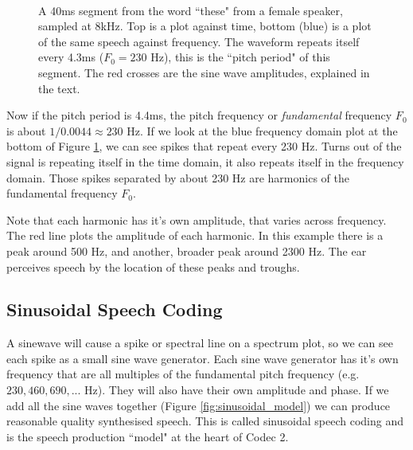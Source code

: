 \documentclass{article}
\begin{document}
\begin{figure} [H]
\caption{ A 40ms segment from the word ``these" from a female speaker, sampled at 8kHz. Top is a plot against time, bottom (blue) is a plot of the same speech against frequency. The waveform repeats itself every 4.3ms ($F_0=230$ Hz), this is the ``pitch period" of this segment.  The red crosses are the sine wave amplitudes, explained in the text.}
\label{fig:hts2a_time}
\begin{center}

\\

\end{center}
\end{figure}

Now if the pitch period is 4.4ms, the pitch frequency or \emph{fundamental} frequency $F_0$ is about $1/0.0044 \approx 230$ Hz.  If we look at the blue frequency domain plot at the bottom of Figure \ref{fig:hts2a_time}, we can see spikes that repeat every 230 Hz.  Turns out of the signal is repeating itself in the time domain, it also repeats itself in the frequency domain.  Those spikes separated by about 230 Hz are harmonics of the fundamental frequency $F_0$.

Note that each harmonic has it's own amplitude, that varies across frequency.  The red line plots the amplitude of each harmonic. In this example there is a peak around 500 Hz, and another, broader peak around 2300 Hz.  The ear perceives speech by the location of these peaks and troughs.

\subsection{Sinusoidal Speech Coding}

A sinewave will cause a spike or spectral line on a spectrum plot, so we can see each spike as a small sine wave generator.  Each sine wave generator has it's own frequency that are all multiples of the fundamental pitch frequency (e.g. $230, 460, 690,...$ Hz).  They will also have their own amplitude and phase.  If we add all the sine waves together (Figure \ref{fig:sinusoidal_model}) we can produce reasonable quality synthesised speech.  This is called sinusoidal speech coding and is the speech production ``model" at the heart of Codec 2.
\end{document}
